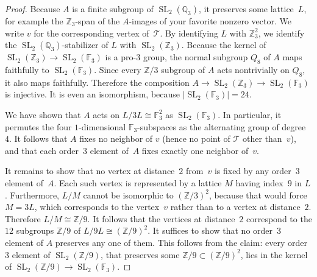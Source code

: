 \documentclass[11pt]{article}
\theoremstyle{definition}
\numberwithin{equation}{section}
\numberwithin{figure}{section}
\numberwithin{table}{section}
\newcommand*\sset{\subset}
\newcommand*\Z{\mathbb{Z}}
\newcommand*\Q{\mathbb{Q}}
\newcommand*\F{\mathbb{F}}
\let\iso\cong
\DeclareMathOperator{\SL}{SL}
\newcommand{\calT}{\mathcal{T}}
\begin{document}
\begin{proof}
Because $A$ is a finite subgroup of $\SL_2(\Q_3)$, it preserves some lattice~$L$, for example the $\Z_3$-span of the $A$-images of your favorite nonzero vector. We write $v$ for the corresponding vertex of~$\calT$. By identifying $L$ with $\Z_3^2$, we identify the $\SL_2(\Q_3)$-stabilizer of $L$ with $\SL_2(\Z_3)$. Because the kernel of $\SL_2(\Z_3)\to\SL_2(\F_3)$ is a pro-$3$ group, the normal subgroup $Q_8$ of $A$ maps faithfully to $\SL_2(\F_3)$. Since every $\Z/3$ subgroup of $A$ acts nontrivially on $Q_8$, it also maps faithfully. Therefore the composition $A\to\SL_2(\Z_3)\to\SL_2(\F_3)$ is injective. It is even an isomorphism, because $\mathopen|\SL_2(\F_3)|=24$.

We have shown that $A$ acts on $L/3L\iso\F_3^2$ as $\SL_2(\F_3)$. In particular, it permutes the four $1$-dimensional $\F_3$-subspaces as the alternating group of degree~$4$. It follows that $A$ fixes no neighbor of $v$ (hence no point of $\calT$ other than~$v$), and that each order~$3$ element of~$A$ fixes exactly one neighbor of~$v$.

It remains to show that no vertex at distance~$2$ from~$v$ is fixed by any order~$3$ element of~$A$. Each such vertex is represented by a lattice $M$ having index~$9$ in $L$. Furthermore, $L/M$ cannot be isomorphic to $(\Z/3)^2$, because that would force $M=3L$, which corresponds to the vertex~$v$ rather than to a vertex at distance~$2$. Therefore $L/M\iso\Z/9$. It follows that the vertices at distance~$2$ correspond to the $12$ subgroups $\Z/9$ of $L/9L\iso(\Z/9)^2$. It suffices to show that no order~$3$ element of $A$ preserves any one of them. This follows from the claim: every order~$3$ element of $\SL_2(\Z/9)$, that preserves some $\Z/9\sset(\Z/9)^2$, lies in the kernel of $\SL_2(\Z/9)\to\SL_2(\F_3)$.


\end{proof}
\end{document}
